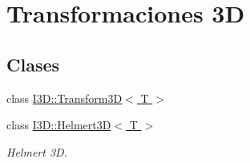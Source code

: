\hypertarget{group__trf3_d_group}{}\section{Transformaciones 3D}
\label{group__trf3_d_group}
\subsection*{Clases}
\begin{DoxyCompactItemize}
\item 
class \hyperlink{class_i3_d_1_1_transform3_d}{I3\+D\+::\+Transform3\+D$<$ T $>$}
\item 
class \hyperlink{class_i3_d_1_1_helmert3_d}{I3\+D\+::\+Helmert3\+D$<$ T $>$}
\begin{DoxyCompactList}\small\item\em Helmert 3D. \end{DoxyCompactList}\end{DoxyCompactItemize}
